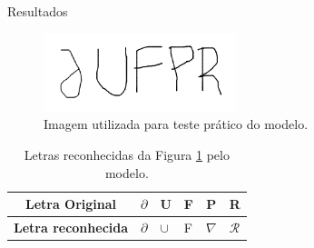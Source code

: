 \documentclass{beamer}
\begin{document}
    \begin{frame}{Resultados}
        \begin{figure}[hbt]
            \centering
            \includegraphics[width=0.5\textwidth]{TesteUFPR.png}
            \caption{Imagem utilizada para teste prático do modelo.}
            \label{fig:parufpr}
        \end{figure}
        
         \begin{table}[htb]
            \centering
            \caption{Letras reconhecidas da Figura \ref{fig:parufpr} pelo modelo.}
            \label{tab:parufpr}
            \begin{tabular}{@{}clllll@{}}
                \toprule
                \textbf{Letra Original}    & \multicolumn{1}{c}{$\partial$} & \multicolumn{1}{c}{U} &     \multicolumn{1}{c}{F} & \multicolumn{1}{c}{P} & \multicolumn{1}{c}{R} \\ \midrule
                \textbf{Letra reconhecida} & $\partial$                     & $\cup$                & F                     & $\nabla$              & $\mathcal{R}$         \\ \bottomrule
            \end{tabular}
        \end{table}
    \end{frame}
    
\end{document}
